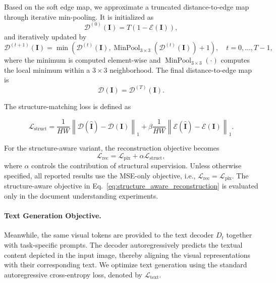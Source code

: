 \documentclass{article}
\begin{document}
Based on the soft edge map, we approximate a truncated distance-to-edge
map through iterative min-pooling. It is initialized as
\begin{equation}
\mathcal{D}^{(0)}(\mathbf{I})
=
T\left(1-\mathcal{E}(\mathbf{I})\right),
\label{eq:distance_init}
\end{equation}
and iteratively updated by
\begin{equation}
\mathcal{D}^{(t+1)}(\mathbf{I})
=
\min
\left(
\mathcal{D}^{(t)}(\mathbf{I}),
\operatorname{MinPool}_{3\times3}
\left(
\mathcal{D}^{(t)}(\mathbf{I})
\right)
+1
\right),
\quad
t=0,\ldots,T-1,
\label{eq:distance_update}
\end{equation}
where the minimum is computed element-wise and
$\operatorname{MinPool}_{3\times3}(\cdot)$ computes the local minimum
within a $3\times3$ neighborhood. The final distance-to-edge map is
\begin{equation}
\mathcal{D}(\mathbf{I})
=
\mathcal{D}^{(T)}(\mathbf{I}).
\label{eq:distance_final}
\end{equation}



The structure-matching loss is defined as


\begin{equation}
\mathcal{L}_{\mathrm{struct}}
=\frac{1}{HW}
\left\|
\mathcal{D}(\hat{\mathbf{I}})
-
\mathcal{D}(\mathbf{I})
\right\|_1 + \beta
\frac{1}{HW}
\left\|
\mathcal{E}(\hat{\mathbf{I}})
-
\mathcal{E}(\mathbf{I})
\right\|_1.
\label{eq:structure_loss}
\end{equation}




For the structure-aware variant, the reconstruction objective becomes
\begin{equation}
\mathcal{L}_{\mathrm{rec}}
=
\mathcal{L}_{\mathrm{pix}}
+
\alpha\mathcal{L}_{\mathrm{struct}},
\label{eq:structure_aware_reconstruction}
\end{equation}
where $\alpha$ controls the contribution of structural supervision.
Unless otherwise specified, all reported results use the MSE-only
objective, i.e.,
$\mathcal{L}_{\mathrm{rec}}=\mathcal{L}_{\mathrm{pix}}$.
The structure-aware objective in Eq.~\eqref{eq:structure_aware_reconstruction}
is evaluated only in the document understanding experiments.

\paragraph{Text Generation Objective.}
Meanwhile, the same visual tokens are provided to the text decoder $D_t$ together with task-specific prompts. The decoder autoregressively predicts the textual content depicted in the input image, thereby aligning the visual representations with their corresponding text. We optimize
text generation using the standard autoregressive cross-entropy loss, denoted by $\mathcal{L}_{\mathrm{text}}$.
\end{document}
